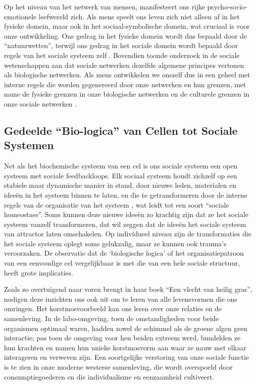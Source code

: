 \documentclass[
  11pt,
]{book}
\begin{document}
Op het niveau van het netwerk van mensen, manifesteert ons rijke psycho-socio-emotionele leefwereld zich. Als mens speelt ons leven zich niet alleen af in het fysieke domein, maar ook in het sociaal-symbolische domein, wat cruciaal is voor onze ontwikkeling. Ons gedrag in het fysieke domein wordt dus bepaald door de ``natuurwetten'', terwijl ons gedrag in het sociale domein wordt bepaald door regels van het sociale systeem zelf \citep{capraLuisi2014}. Bovendien toonde onderzoek in de sociale wetenschappen aan dat sociale netwerken dezelfde algemene principes vertonen als biologische netwerken. Als mens ontwikkelen we onszelf dus in een geheel met interne regels die worden gegenereerd door onze netwerken en hun grenzen, met name de fysieke grenzen in onze biologische netwerken en de culturele grenzen in onze sociale netwerken \citep{capraLuisi2014}.

\hypertarget{gedeelde-bio-logica-van-cellen-tot-sociale-systemen}{%
\subsection{Gedeelde ``Bio-logica'' van Cellen tot Sociale Systemen}\label{gedeelde-bio-logica-van-cellen-tot-sociale-systemen}}

Net als het biochemische systeem van een cel is ons sociale systeem een open systeem met sociale feedbackloops. Elk sociaal systeem houdt zichzelf op een stabiele maar dynamische manier in stand, door nieuwe leden, materialen en ideeën in het systeem binnen te laten, en die te getransformeren door de interne regels van de organisatie van het systeem \citep{capraLuisi2014}, wat leidt tot een soort ``sociale homeostase''. Soms kunnen deze nieuwe ideeën zo krachtig zijn dat ze het sociale systeem vanzelf transformeren, dat wil zeggen dat de ideeën het sociale systeem van attractor laten omschakelen. Op individueel niveau zijn de transformaties die het sociale systeem oplegt soms gelukzalig, maar ze kunnen ook trauma's veroorzaken. De observatie dat de `biologische logica' of het organisatiepatroon van een eenvoudige cel vergelijkbaar is met die van een hele sociale structuur, heeft grote implicaties.

Zoals \citet{Kimmerer2013} zo overtuigend naar voren brengt in haar boek ``Een vlecht van heilig gras'', nodigen deze inzichten ons ook uit om te leren van alle levensvormen die ons omringen. Het korstmosvoorbeeld kan ons leren over onze relaties en de samenleving. In de labo-omgeving, toen de omstandigheden voor beide organismen optimaal waren, hadden zowel de schimmel als de groene algen geen interactie; pas toen de omgeving voor hen beiden extreem werd, bundelden ze hun krachten en namen hun unieke korstmosvorm aan waar ze nauw met elkaar interageren en verweven zijn. Een soortgelijke verstoring van onze sociale functie is te zien in onze moderne westerse samenleving, die wordt overspoeld door consumptiegoederen en die individualisme en eenzaamheid cultiveert.
\end{document}
